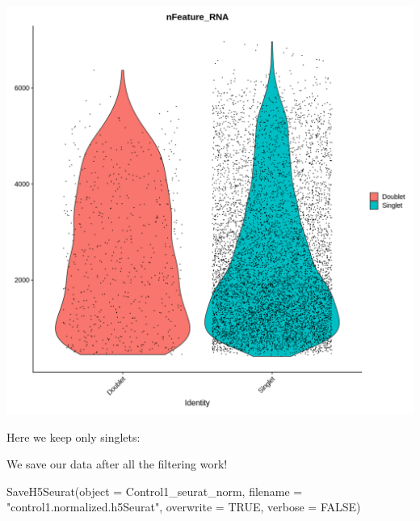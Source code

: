 \documentclass[
  letterpaper,
  DIV=11,
  numbers=noendperiod]{scrartcl}
\newenvironment{Shaded}{}{}
\newcommand{\AttributeTok}[1]{\textcolor[rgb]{0.49,0.56,0.16}{#1}}
\newcommand{\ConstantTok}[1]{\textcolor[rgb]{0.53,0.00,0.00}{#1}}
\newcommand{\DecValTok}[1]{\textcolor[rgb]{0.25,0.63,0.44}{#1}}
\newcommand{\FunctionTok}[1]{\textcolor[rgb]{0.02,0.16,0.49}{#1}}
\newcommand{\NormalTok}[1]{#1}
\newcommand{\OtherTok}[1]{\textcolor[rgb]{0.00,0.44,0.13}{#1}}
\newcommand{\SpecialCharTok}[1]{\textcolor[rgb]{0.25,0.44,0.63}{#1}}
\newcommand{\StringTok}[1]{\textcolor[rgb]{0.25,0.44,0.63}{#1}}
\begin{document}
\includegraphics{tutorial-2024_files/figure-pdf/cell-42-output-1.png}

Here we keep only singlets:

\begin{Shaded}
\end{Shaded}

We save our data after all the filtering work!

\begin{Shaded}
\begin{Highlighting}[]
\FunctionTok{SaveH5Seurat}\NormalTok{(}\AttributeTok{object =}\NormalTok{ Control1\_seurat\_norm, }
             \AttributeTok{filename =} \StringTok{"control1.normalized.h5Seurat"}\NormalTok{, }
             \AttributeTok{overwrite =} \ConstantTok{TRUE}\NormalTok{,}
             \AttributeTok{verbose =} \ConstantTok{FALSE}\NormalTok{)}
\end{Highlighting}
\end{Shaded}
\end{document}
